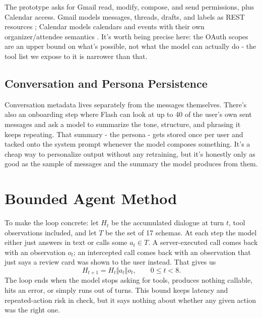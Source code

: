 \documentclass[conference]{IEEEtran}
\begin{document}
The prototype asks for Gmail read, modify, compose, and send permissions, plus Calendar access. Gmail models messages, threads, drafts, and labels as REST resources \cite{gmailapi}; Calendar models calendars and events with their own organizer/attendee semantics \cite{calendarapi}. It's worth being precise here: the OAuth scopes are an upper bound on what's possible, not what the model can actually do - the tool list we expose to it is narrower than that.

\subsection{Conversation and Persona Persistence}

Conversation metadata lives separately from the messages themselves. There's also an onboarding step where Flash can look at up to 40 of the user's own sent messages and ask a model to summarize the tone, structure, and phrasing it keeps repeating. That summary - the persona - gets stored once per user and tacked onto the system prompt whenever the model composes something. It's a cheap way to personalize output without any retraining, but it's honestly only as good as the sample of messages and the summary the model produces from them.

\section{Bounded Agent Method}

To make the loop concrete: let $H_t$ be the accumulated dialogue at turn $t$, tool observations included, and let $T$ be the set of 17 schemas. At each step the model either just answers in text or calls some $a_t \in T$. A server-executed call comes back with an observation $o_t$; an intercepted call comes back with an observation that just says a review card was shown to the user instead. That gives us
\begin{equation}
H_{t+1} = H_t \Vert a_t \Vert o_t, \qquad 0 \leq t < 8.
\end{equation}
The loop ends when the model stops asking for tools, produces nothing callable, hits an error, or simply runs out of turns. This bound keeps latency and repeated-action risk in check, but it says nothing about whether any given action was the right one.
\end{document}
